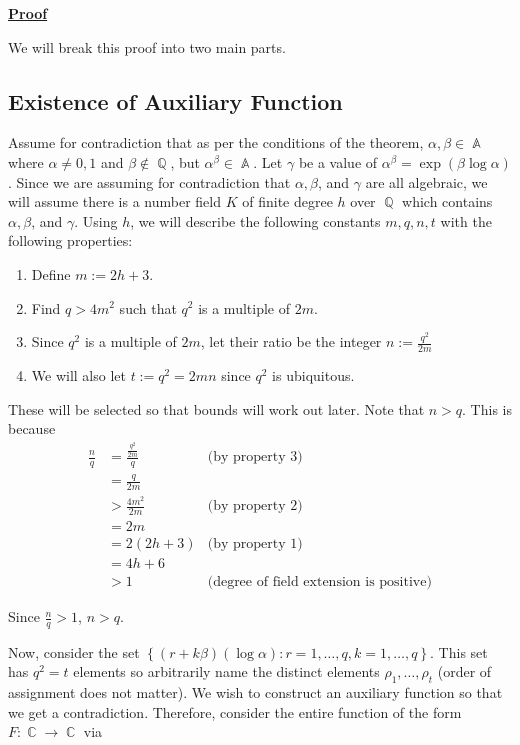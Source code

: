 \documentclass[a4paper, 11pt]{book}
\newcommand{\proof}{\underline{\textbf{Proof}} }
\DeclareMathOperator{\A}{\mathbb{A}}
\DeclareMathOperator{\C}{\mathbb{C}}
\DeclareMathOperator{\Q}{\mathbb{Q}}
\begin{document}
\proof{We will break this proof into two main parts.

    \subsection{Existence of Auxiliary Function} Assume for contradiction that as per the conditions of the theorem, $\alpha, \beta \in \A$ where $\alpha \neq 0, 1$ and $\beta \notin \Q$, but $\alpha^{\beta} \in \A$. Let $\gamma$ be a value of ${\alpha}^{\beta} = \exp(\beta \log \alpha)$. Since we are assuming for contradiction that $\alpha, \beta$, and $\gamma$ are all algebraic, we will assume there is a number field $K$ of finite degree $h$ over $\Q$ which contains $\alpha, \beta$, and $\gamma$. Using $h$, we will describe the following constants $m,q,n,t$ with the following properties:

    \begin{enumerate}
        \item{Define $m := 2h+3$.}
        \item{Find $q > 4m^2$ such that $q^2$ is a multiple of $2m$.}
        \item{Since $q^2$ is a multiple of $2m$, let their ratio be the integer $n := \frac{q^2}{2m}$}
        \item{We will also let $t := q^2 = 2mn$ since $q^2$ is ubiquitous.}
    \end{enumerate}

    These will be selected so that bounds will work out later. Note that $n > q$. This is because 
    \begin{align*}
        \frac{n}{q} &= \frac{\frac{q^2}{2m}}{q} & \text{(by property 3)}\\
                    &= \frac{q}{2m} \\
                    &> \frac{4m^2}{2m} &\text{(by property 2)}\\
                    &= 2m \\
                    &= 2(2h+3) &\text{(by property 1)}\\
                    &= 4h+6 \\
                    &> 1 &\text{(degree of field extension is positive)} 
    \end{align*}

    Since $\frac{n}{q} > 1$, $n > q$.\par 
    Now, consider the set $\left\{(r + k\beta)(\log \alpha) : r = 1, \ldots, q, k = 1, \ldots, q\right\}$. This set has $q^2 = t$ elements so arbitrarily name the distinct elements $\rho_1, \ldots, \rho_t$ (order of assignment does not matter). We wish to construct an auxiliary function so that we get a contradiction. Therefore, consider the entire function of the form $F: \C \to \C$ via 

}
\end{document}
